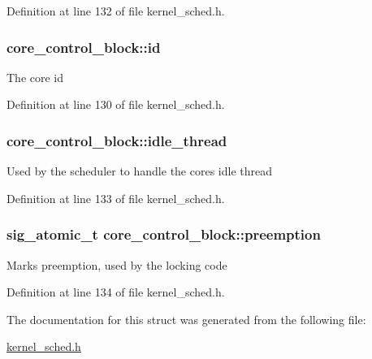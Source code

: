 Definition at line 132 of file kernel\+\_\+sched.\+h.

\subsubsection[{\texorpdfstring{id}{id}}]{ core\+\_\+control\+\_\+block\+::id}\hypertarget{structcore__control__block_a5208867f309bdd1656fd473f38b30bfe}{}\label{structcore__control__block_a5208867f309bdd1656fd473f38b30bfe}
The core id 

Definition at line 130 of file kernel\+\_\+sched.\+h.

\subsubsection[{\texorpdfstring{idle\+\_\+thread}{idle_thread}}]{ core\+\_\+control\+\_\+block\+::idle\+\_\+thread}\hypertarget{structcore__control__block_a6dd29dab4a95ce740f45370345408c52}{}\label{structcore__control__block_a6dd29dab4a95ce740f45370345408c52}
Used by the scheduler to handle the core\textquotesingle{}s idle thread 

Definition at line 133 of file kernel\+\_\+sched.\+h.

\subsubsection[{\texorpdfstring{preemption}{preemption}}]{\setlength{\rightskip}{0pt plus 5cm}sig\+\_\+atomic\+\_\+t core\+\_\+control\+\_\+block\+::preemption}\hypertarget{structcore__control__block_a858cde45d4478d73f60e839594b363f4}{}\label{structcore__control__block_a858cde45d4478d73f60e839594b363f4}
Marks preemption, used by the locking code 

Definition at line 134 of file kernel\+\_\+sched.\+h.



The documentation for this struct was generated from the following file\+:\begin{DoxyCompactItemize}
\item 
\hyperlink{kernel__sched_8h}{kernel\+\_\+sched.\+h}\end{DoxyCompactItemize}
